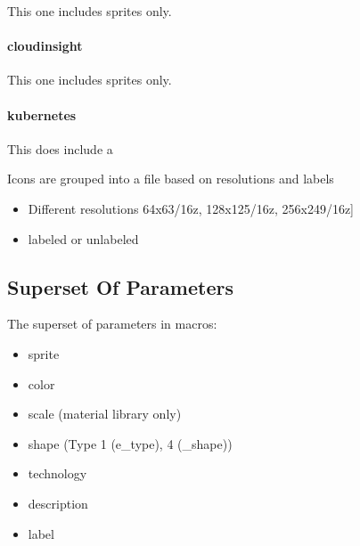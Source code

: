 \documentclass[letterpaper,10pt,english]{sphinxmanual}
\begin{document}
This one includes sprites only.


\paragraph{cloudinsight}
\label{\detokenize{Stdlib/StdLibOverview:cloudinsight}}

This one includes sprites only.


\paragraph{kubernetes}
\label{\detokenize{Stdlib/StdLibOverview:kubernetes}}

This does include a 

Icons are grouped into a file based on resolutions and labels
\begin{itemize}
\item {} 
Different resolutions 64x63/16z, 128x125/16z, 256x249/16z{]}

\item {} 
labeled or unlabeled

\end{itemize}


\subsection{Superset Of Parameters}
\label{\detokenize{Stdlib/StdLibOverview:superset-of-parameters}}
The superset of parameters in macros:
\begin{itemize}
\item {} 
sprite

\item {} 
color

\item {} 
scale (material library only)

\item {} 
shape (Type 1 (e\_type), 4 (\_shape))

\item {} 
technology

\item {} 
description

\item {} 
label

\end{itemize}
\end{document}
